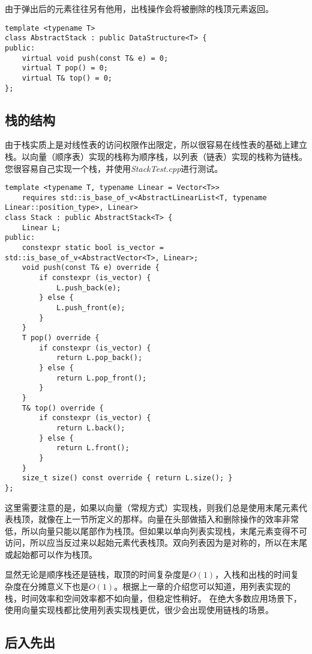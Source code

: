 由于弹出后的元素往往另有他用，出栈操作会将被删除的栈顶元素返回。

\begin{lstlisting}
template <typename T>
class AbstractStack : public DataStructure<T> {
public:
    virtual void push(const T& e) = 0;
    virtual T pop() = 0;
    virtual T& top() = 0;
};
\end{lstlisting}

\subsection{栈的结构}
\label{stack:栈的实现}
由于栈实质上是对线性表的访问权限作出限定，所以很容易在线性表的基础上建立栈。以向量（顺序表）实现的栈称为顺序栈，以列表（链表）实现的栈称为链栈。您很容易自己实现一个栈，并使用\textit{StackTest.cpp}进行测试。

\begin{lstlisting}
template <typename T, typename Linear = Vector<T>>
    requires std::is_base_of_v<AbstractLinearList<T, typename Linear::position_type>, Linear>
class Stack : public AbstractStack<T> {
    Linear L;
public:
    constexpr static bool is_vector = std::is_base_of_v<AbstractVector<T>, Linear>;
    void push(const T& e) override {
        if constexpr (is_vector) {
            L.push_back(e);
        } else {
            L.push_front(e);
        }
    }
    T pop() override {
        if constexpr (is_vector) {
            return L.pop_back();
        } else {
            return L.pop_front();
        }
    }
    T& top() override {
        if constexpr (is_vector) {
            return L.back();
        } else {
            return L.front();
        }
    }
    size_t size() const override { return L.size(); }
};

\end{lstlisting}

这里需要注意的是，如果以向量（常规方式）实现栈，则我们总是使用末尾元素代表栈顶，就像在上一节所定义的那样。向量在头部做插入和删除操作的效率非常低，所以向量只能以尾部作为栈顶。但如果以单向列表实现栈，末尾元素变得不可访问，所以应当反过来以起始元素代表栈顶。双向列表因为是对称的，所以在末尾或起始都可以作为栈顶。

显然无论是顺序栈还是链栈，取顶的时间复杂度是$O(1)$，入栈和出栈的时间复杂度在分摊意义下也是$O(1)$。根据上一章的介绍您可以知道，用列表实现的栈，时间效率和空间效率都不如向量，但稳定性稍好。
在绝大多数应用场景下，使用向量实现栈都比使用列表实现栈更优，很少会出现使用链栈的场景。

\subsection{后入先出}

